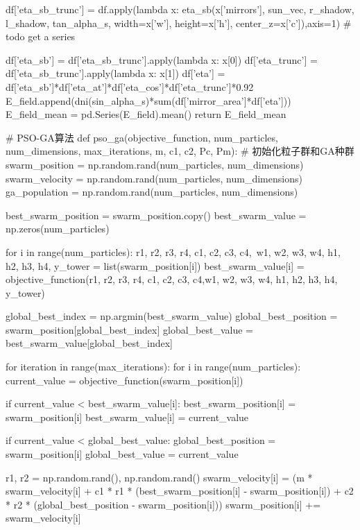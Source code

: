 \documentclass{article}
\numberwithin{equation}{subsection}
\begin{document}
\begin{python}
        df['eta_sb_trunc'] = df.apply(lambda x: eta_sb(x['mirrors'], sun_vec, r_shadow, l_shadow, tan_alpha_s, width=x['w'], height=x['h'], center_z=x['c']),axis=1)            # todo get a series

        df['eta_sb'] = df['eta_sb_trunc'].apply(lambda x: x[0])
        df['eta_trunc'] = df['eta_sb_trunc'].apply(lambda x: x[1])
        df['eta'] = df['eta_sb']*df['eta_at']*df['eta_cos']*df['eta_trunc']*0.92
        E_field.append(dni(sin_alpha_s)*sum(df['mirror_area']*df['eta']))
    E_field_mean = pd.Series(E_field).mean()
    return E_field_mean


# PSO-GA算法
def pso_ga(objective_function, num_particles, num_dimensions, max_iterations,
           m, c1, c2, Pc, Pm):
    # 初始化粒子群和GA种群
    swarm_position = np.random.rand(num_particles, num_dimensions)
    swarm_velocity = np.random.rand(num_particles, num_dimensions)
    ga_population = np.random.rand(num_particles, num_dimensions)

    best_swarm_position = swarm_position.copy()
    best_swarm_value = np.zeros(num_particles)

    for i in range(num_particles):
        r1, r2, r3, r4, c1, c2, c3, c4,\
        w1, w2, w3, w4, h1, h2, h3, h4, y_tower = list(swarm_position[i])
        best_swarm_value[i] = objective_function(r1, r2, r3, r4,  c1, c2, c3, c4,w1, w2, w3, w4, h1, h2, h3, h4, y_tower)

    global_best_index = np.argmin(best_swarm_value)
    global_best_position = swarm_position[global_best_index]
    global_best_value = best_swarm_value[global_best_index]

    for iteration in range(max_iterations):
        for i in range(num_particles):
            current_value = objective_function(swarm_position[i])

            if current_value < best_swarm_value[i]:
                best_swarm_position[i] = swarm_position[i]
                best_swarm_value[i] = current_value

            if current_value < global_best_value:
                global_best_position = swarm_position[i]
                global_best_value = current_value

            r1, r2 = np.random.rand(), np.random.rand()
            swarm_velocity[i] = (m * swarm_velocity[i] +
                                  c1 * r1 * (best_swarm_position[i] - swarm_position[i]) +
                                  c2 * r2 * (global_best_position - swarm_position[i]))
            swarm_position[i] += swarm_velocity[i]


\end{python}
\end{document}
